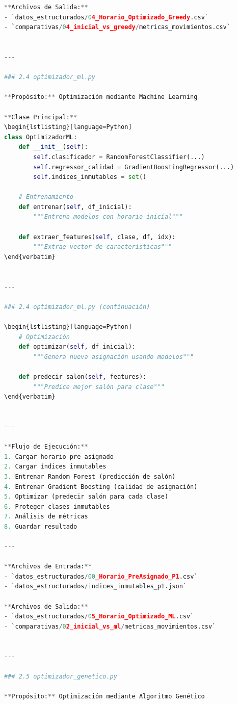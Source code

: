 \begin{itemize}
\begin{itemize}
\begin{itemize}
\begin{itemize}
\begin{itemize}
\begin{itemize}
\begin{enumerate}
\begin{enumerate}
\begin{enumerate}
\begin{enumerate}
\begin{lstlisting}[language=Python]
**Archivos de Salida:**
- `datos_estructurados/04_Horario_Optimizado_Greedy.csv`
- `comparativas/04_inicial_vs_greedy/metricas_movimientos.csv`


---

### 2.4 optimizador_ml.py

**Propósito:** Optimización mediante Machine Learning

**Clase Principal:**
\begin{lstlisting}[language=Python]
class OptimizadorML:
    def __init__(self):
        self.clasificador = RandomForestClassifier(...)
        self.regressor_calidad = GradientBoostingRegressor(...)
        self.indices_inmutables = set()
    
    # Entrenamiento
    def entrenar(self, df_inicial):
        """Entrena modelos con horario inicial"""
    
    def extraer_features(self, clase, df, idx):
        """Extrae vector de características"""
\end{verbatim}


---

### 2.4 optimizador_ml.py (continuación)

\begin{lstlisting}[language=Python]
    # Optimización
    def optimizar(self, df_inicial):
        """Genera nueva asignación usando modelos"""
    
    def predecir_salon(self, features):
        """Predice mejor salón para clase"""
\end{verbatim}


---

**Flujo de Ejecución:**
1. Cargar horario pre-asignado
2. Cargar índices inmutables
3. Entrenar Random Forest (predicción de salón)
4. Entrenar Gradient Boosting (calidad de asignación)
5. Optimizar (predecir salón para cada clase)
6. Proteger clases inmutables
7. Análisis de métricas
8. Guardar resultado

---

**Archivos de Entrada:**
- `datos_estructurados/00_Horario_PreAsignado_P1.csv`
- `datos_estructurados/indices_inmutables_p1.json`

**Archivos de Salida:**
- `datos_estructurados/05_Horario_Optimizado_ML.csv`
- `comparativas/02_inicial_vs_ml/metricas_movimientos.csv`


---

### 2.5 optimizador_genetico.py

**Propósito:** Optimización mediante Algoritmo Genético


\end{lstlisting}
\end{enumerate}
\end{enumerate}
\end{enumerate}
\end{enumerate}
\end{itemize}
\end{itemize}
\end{itemize}
\end{itemize}
\end{itemize}
\end{itemize}
